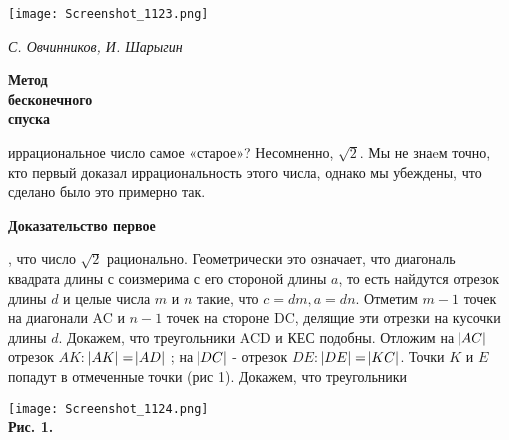 \setcounter{page}{24}

\pagestyle{fancy}
\fancyhead{}
\fancyfoot{} 
\fancyfoot[L]{\thepage}

\twocolumn
\begin{flushleft}
    \texttt{[image: Screenshot\_1123.png]}
\end{flushleft}
\vspace{1em}
\begin{flushleft}
\textit{С. Овчинников, И. Шарыгин}
\vspace{1em}

\huge{\textbf{Метод \\бесконечного \\спуска}} 
\end{flushleft}

\vspace{1em}
 иррациональное число самое «старое»? Несомненно, $\sqrt{2}$. Мы не знаeм точно, кто первый доказал иррациональность этого числа, однако мы убеждены, что сделано было это примерно так. 

\vspace{1em}

\noindent\textbf{Доказательство первое}
\vspace{0.3em}

, что число $\sqrt{2}$ рационально. Геометрически это означает, что диагональ квадрата длины с соизмерима с его стороной длины $a$, то есть найдутся отрезок длины $d$ и целые числа $m$ и $n$ такие, что $c = dm, a = dn$. Отметим $m-1$ точек на диагонали AC и $n-1$ точек на стороне DC, делящие эти отрезки на кусочки длины $d$. Докажем, что треугольники ACD и КЕС подобны. Отложим на $\abs{AC}$ отрезок $AK$: $\abs{AK} = \abs{AD}$ ; на $\abs{DC}$ - отрезок $DE$: $\abs{DE} = \abs{KC}$. Точки $K$ и $E$ попадут в отмеченные точки (рис 1). Докажем, что треугольники



\texttt{[image: Screenshot\_1124.png]}\\
\textbf{Рис. 1.}

